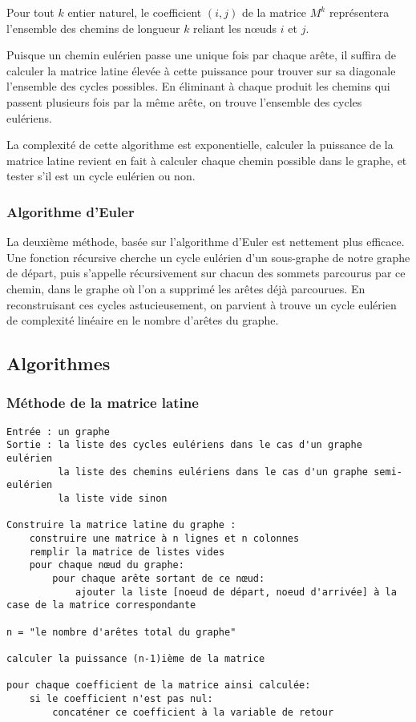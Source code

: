 \documentclass{scrartcl}
\begin{document}
      Pour tout $k$ entier naturel, le coefficient $(i,j)$ de la matrice $M^k$
      représentera l'ensemble des chemins de longueur $k$ reliant les nœuds $i$
      et $j$.
      
      Puisque un chemin eulérien passe une unique fois par chaque arête, il
      suffira de calculer la matrice latine élevée à cette puissance pour
      trouver sur sa diagonale l'ensemble des cycles possibles. En éliminant à
      chaque produit les chemins qui passent plusieurs fois par la même arête,
      on trouve l'ensemble des cycles eulériens.

	  La complexité de cette algorithme est exponentielle, calculer la puissance
	  de la matrice latine revient en fait à calculer chaque chemin possible dans
	  le graphe, et tester s'il est un cycle eulérien ou non.
	
    \subsubsection{Algorithme d'Euler}
      La deuxième méthode, basée sur l'algorithme d'Euler est nettement plus
      efficace. Une fonction récursive cherche un cycle eulérien d'un
      sous-graphe de notre graphe de départ, puis s'appelle récursivement sur
      chacun des sommets parcourus par ce chemin, dans le graphe où l'on a
      supprimé les arêtes déjà parcourues. En reconstruisant ces cycles
      astucieusement, on parvient à trouve un cycle eulérien de complexité
      linéaire en le nombre d'arêtes du graphe. 

  \subsection{Algorithmes}
    \subsubsection{Méthode de la matrice latine}
      \begin{lstlisting}
Entrée : un graphe
Sortie : la liste des cycles eulériens dans le cas d'un graphe eulérien
         la liste des chemins eulériens dans le cas d'un graphe semi-eulérien
         la liste vide sinon

Construire la matrice latine du graphe :
    construire une matrice à n lignes et n colonnes
    remplir la matrice de listes vides
    pour chaque nœud du graphe:
        pour chaque arête sortant de ce nœud:
            ajouter la liste [noeud de départ, noeud d'arrivée] à la case de la matrice correspondante

n = "le nombre d'arêtes total du graphe"

calculer la puissance (n-1)ième de la matrice

pour chaque coefficient de la matrice ainsi calculée:
    si le coefficient n'est pas nul:
        concaténer ce coefficient à la variable de retour
      \end{lstlisting}
\end{document}
